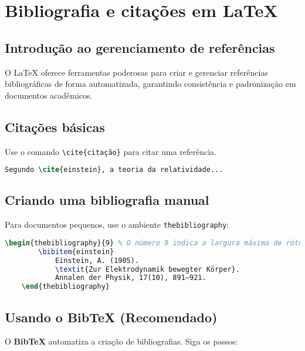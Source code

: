 \chapter{Bibliografia e citações em LaTeX}



\section{Introdução ao gerenciamento de referências}

O LaTeX oferece ferramentas poderosas para criar e gerenciar referências bibliográficas de forma automatizada, garantindo consistência e padronização em documentos acadêmicos.

\section{Citações básicas}

Use o comando \verb|\cite{citação}| para citar uma referência.

\begin{lstlisting}[language=tex, caption=Exemplo simples de citação]
    Segundo \cite{einstein}, a teoria da relatividade...
\end{lstlisting}

\section{Criando uma bibliografia manual}

Para documentos pequenos, use o ambiente \verb|thebibliography|:

\begin{lstlisting}[language=tex, caption=Equação inline]
    \begin{thebibliography}{9} % O número 9 indica a largura máxima de rótulos
        \bibitem{einstein}  
            Einstein, A. (1905).  
            \textit{Zur Elektrodynamik bewegter Körper}.  
            Annalen der Physik, 17(10), 891–921.  
    \end{thebibliography}
\end{lstlisting}

\section{Usando o BibTeX (Recomendado)}

O \textbf{BibTeX} automatiza a criação de bibliografias. Siga os passos:

